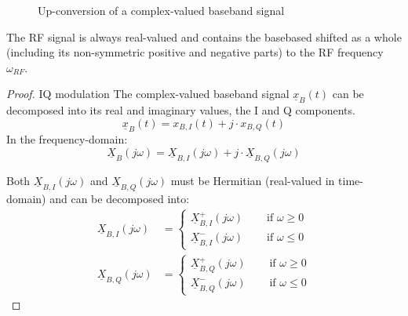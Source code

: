 \begin{refsection}
\begin{figure}[H]
	\caption{Up-conversion of a complex-valued baseband signal}
	\label{fig:ch05:iq_up_freqdomain}
\end{figure}

The \ac{RF} signal is always real-valued and contains the basebased shifted as a whole (including its non-symmetric positive and negative parts) to the \ac{RF} frequency $\omega_{RF}$.

\begin{proof}{IQ modulation}
	The complex-valued baseband signal $\underline{x}_{B}(t)$ can be decomposed into its real and imaginary values, the \ac{I} and \ac{Q} components.
	\begin{equation}
		\underline{x}_{B}(t) = x_{B,I}(t) + j \cdot x_{B,Q}(t)
	\end{equation}
	In the frequency-domain:
	\begin{equation}
		\underline{X}_{B}\left(j\omega\right) = \underline{X}_{B,I}\left(j\omega\right) + j \cdot \underline{X}_{B,Q}\left(j\omega\right)
		\label{eq:ch05:baseband_tx_freqdom}
	\end{equation}
	
	Both $\underline{X}_{B,I}\left(j\omega\right)$ and $\underline{X}_{B,Q}\left(j\omega\right)$ must be Hermitian (real-valued in time-domain) and can be decomposed into:
	\begin{subequations}
		\begin{align}
			\underline{X}_{B,I}\left(j\omega\right) &= \begin{cases}
				\underline{X}_{B,I}^{+}\left(j\omega\right) & \quad \text{ if } \omega \geq 0 \\
				\underline{X}_{B,I}^{-}\left(j\omega\right) & \quad \text{ if } \omega \leq 0
			\end{cases} \\
			\underline{X}_{B,Q}\left(j\omega\right) &= \begin{cases}
				\underline{X}_{B,Q}^{+}\left(j\omega\right) & \quad \text{ if } \omega \geq 0 \\
				\underline{X}_{B,Q}^{-}\left(j\omega\right) & \quad \text{ if } \omega \leq 0
			\end{cases}
		\end{align}
	\end{subequations}


\end{proof}
\end{refsection}

